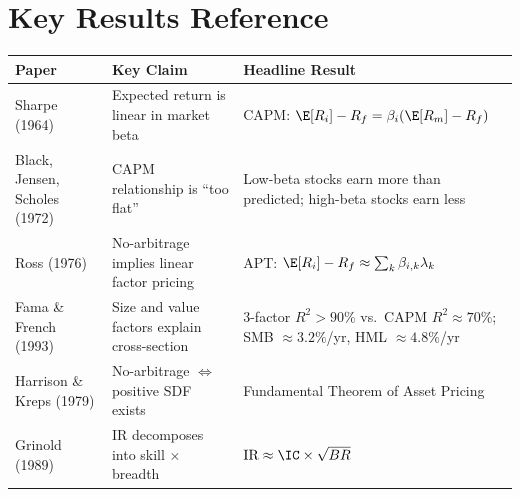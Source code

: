 \section*{Key Results Reference}
\label{sec:ch1-key-results}

\begin{center}
\begin{tabular}{p{4cm} p{4cm} p{5.5cm}}
\toprule
\textbf{Paper} & \textbf{Key Claim} & \textbf{Headline Result} \\
\midrule
Sharpe (1964) & Expected return is linear in market beta & CAPM: $\E[R_i] - R_f = \beta_i (\E[R_m] - R_f)$ \\
\addlinespace
Black, Jensen, Scholes (1972) & CAPM relationship is ``too flat'' & Low-beta stocks earn more than predicted; high-beta stocks earn less \\
\addlinespace
Ross (1976) & No-arbitrage implies linear factor pricing & APT: $\E[R_i] - R_f \approx \sum_k \beta_{i,k} \lambda_k$ \\
\addlinespace
Fama \& French (1993) & Size and value factors explain cross-section & 3-factor $R^2 > 90\%$ vs.\ CAPM $R^2 \approx 70\%$; SMB $\approx 3.2\%$/yr, HML $\approx 4.8\%$/yr \\
\addlinespace
Harrison \& Kreps (1979) & No-arbitrage $\Leftrightarrow$ positive SDF exists & Fundamental Theorem of Asset Pricing \\
\addlinespace
Grinold (1989) & IR decomposes into skill $\times$ breadth & $\text{IR} \approx \IC \times \sqrt{BR}$ \\
\bottomrule
\end{tabular}
\end{center}
